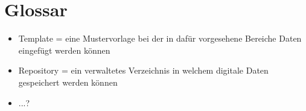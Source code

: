 
\section{Glossar}


\begin{itemize}
	\item Template = eine Mustervorlage bei der in dafür vorgesehene Bereiche Daten eingefügt werden können
	\item Repository = ein verwaltetes Verzeichnis in welchem digitale Daten gespeichert werden können
	\item ...?
\end{itemize}


